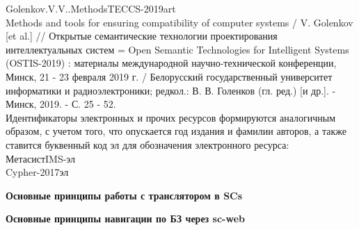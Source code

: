 \begin{SCn}
\begin{scnitemize}
\begin{scnitemizeii}
\begin{scnitemizeiii}
\begin{scnitemizeii}
				Golenkov.V.V..MethodsTECCS-2019art\\
				Methods and tools for ensuring compatibility of computer systems / V. Golenkov [et al.] // Открытые семантические технологии проектирования интеллектуальных систем = Open Semantic Technologies for Intelligent Systems (OSTIS-2019) : материалы международной научно-технической конференции, Минск, 21 - 23 февраля 2019 г. / Белорусский государственный университет информатики и радиоэлектроники; редкол.: В. В. Голенков (гл. ред.) [и др.]. - Минск, 2019. - С. 25 - 52.\\
				
				Идентификаторы электронных и прочих ресурсов формируются аналогичным образом, с учетом того, что опускается год издания и фамилии авторов, а также ставится буквенный код эл для обозначения электронного ресурса:\\
				
				МетасистIMS-эл \\
				Cypher-2017эл 
			\end{scnitemizeii}
		\end{scnitemizeiii}
	\end{scnitemizeii}
	\item \textbf{Основные принципы работы с транслятором в SCs}
	\item \textbf{Основные принципы навигации по БЗ через sc-web}
\end{scnitemize}
\end{SCn}